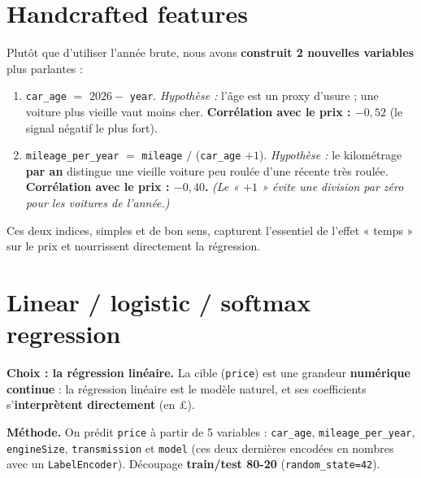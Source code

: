 \documentclass[11pt,a4paper]{article}
\begin{document}
\section{Handcrafted features}

Plutôt que d'utiliser l'année brute, nous avons \textbf{construit 2 nouvelles variables}
plus parlantes :

\begin{enumerate}[leftmargin=1.6em]
  \item \texttt{car\_age} $=$ $2026 -$ \texttt{year}. \textit{Hypothèse :} l'âge est un
    proxy d'usure ; une voiture plus vieille vaut moins cher. \textbf{Corrélation avec le
    prix : $-0{,}52$} (le signal négatif le plus fort).
  \item \texttt{mileage\_per\_year} $=$ \texttt{mileage} $/$ (\texttt{car\_age} $+ 1$).
    \textit{Hypothèse :} le kilométrage \textbf{par an} distingue une vieille voiture peu
    roulée d'une récente très roulée. \textbf{Corrélation avec le prix : $-0{,}40$.}
    \textit{(Le « $+1$ » évite une division par zéro pour les voitures de l'année.)}
\end{enumerate}

Ces deux indices, simples et de bon sens, capturent l'essentiel de l'effet « temps » sur
le prix et nourrissent directement la régression.

\section{Linear / logistic / softmax regression}

\noindent\textbf{Choix : la régression linéaire.} La cible (\texttt{price}) est une
grandeur \textbf{numérique continue} : la régression linéaire est le modèle naturel, et
ses coefficients s'\textbf{interprètent directement} (en £).

\medskip
\noindent\textbf{Méthode.} On prédit \texttt{price} à partir de 5 variables :
\texttt{car\_age}, \texttt{mileage\_per\_year}, \texttt{engineSize},
\texttt{transmission} et \texttt{model} (ces deux dernières encodées en nombres avec un
\texttt{LabelEncoder}). Découpage \textbf{train/test 80-20} (\texttt{random\_state=42}).
\end{document}
